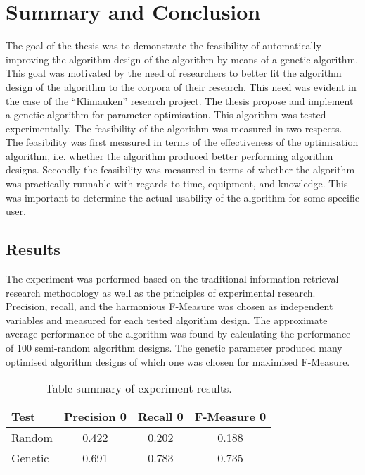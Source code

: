 \chapter{Summary and Conclusion} %
\label{Conclusion} %
The goal of the thesis was to demonstrate the feasibility of automatically improving the algorithm design of the \CTC algorithm by means of a genetic algorithm. This goal was motivated by the need of researchers to better fit the algorithm design of the \CTC algorithm to the corpora of their research. This need was evident in the case of the ``Klimauken'' research project. The thesis propose and implement a genetic algorithm for parameter optimisation. This algorithm was tested experimentally. The feasibility of the algorithm was measured in two respects. The feasibility was first measured in terms of the effectiveness of the optimisation algorithm, i.e. whether the algorithm produced better performing algorithm designs. Secondly the feasibility was measured in terms of whether the algorithm was practically runnable with regards to time, equipment, and knowledge. This was important to determine the actual usability of the algorithm for some specific user.

\section{Results}
The experiment was performed based on the traditional information retrieval research methodology as well as the principles of experimental research. Precision, recall, and the harmonious F-Measure was chosen as independent variables and measured for each tested algorithm design. The approximate average performance of the algorithm was found by calculating the performance of 100 semi-random algorithm designs. The genetic parameter produced many optimised algorithm designs of which one was chosen for maximised F-Measure.

\begin{table}[H]
\begin{center}
\begin{tabular}{|l|ccc|}
\hline
Test & Precision 0 & Recall 0 & F-Measure 0\\ 
\hline
Random 	&   0.422& 	  0.202& 	0.188\\ 
Genetic &   0.691&    0.783&    0.735\\ 
\hline
\end{tabular}
\end{center}
\caption{Table summary of experiment results.}
\label{tab:summarytableresultsconclusion}
\end{table}

